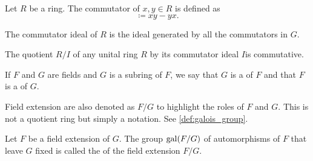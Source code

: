 \begin{definition}\label{def:ring_commutator}
  Let \( R \) be a ring. The commutator of \( x, y \in R \) is defined as
  \begin{equation*}
    [x, y] \coloneqq xy - yx.
  \end{equation*}

  The commutator ideal of \( R \) is the ideal generated by all the commutators in \( G \).
\end{definition}

\begin{proposition}\label{thm:quotient_by_commutator_ideal}
  The quotient \( R / I \) of any unital ring \( R \) by its commutator ideal \( I \)is commutative.
\end{proposition}

\begin{definition}\label{def:field_extension}
  If \( F \) and \( G \) are fields and \( G \) is a subring of \( F \), we say that \( G \) is a  of \( F \) and that \( F \) is a  of \( G \).

  Field extension are also denoted as \( F / G \) to highlight the roles of \( F \) and \( G \). This is not a quotient ring but simply a notation. See \cref{def:galois_group}.
\end{definition}

\begin{definition}\label{def:galois_group}\cite[124]{Knapp2016BAlg}
  Let \( F \) be a field extension of \( G \). The group \( \operatorname{gal}(F / G) \) of automorphisms of \( F \) that leave \( G \) fixed is called the  of the field extension \( F / G \).
\end{definition}
